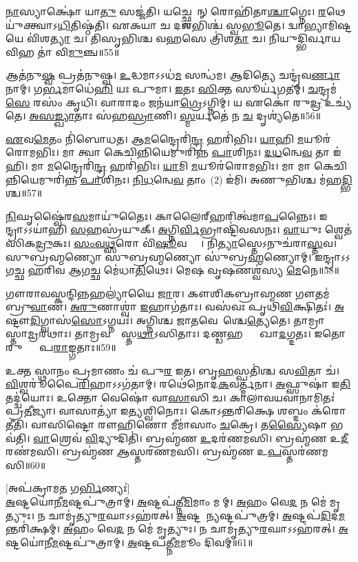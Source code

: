 \ul{𑌨𑌾}𑌸𑍍𑌯𑌾𑌕𑍍𑌷𑍋॑ 𑌯𑌾\ul{𑌤𑍁} 𑌸𑌜𑍍𑌜॑𑌤𑌿। 𑌯𑌚𑍍𑌛𑍍𑌵𑍇𑌤𑌾᳚𑌨𑍍‌ 𑌰𑍋𑌹𑌿॑𑌤𑌾\ul{𑌶𑍍𑌚𑌾}𑌗𑍍𑌨𑍇𑌃। 
\ul{𑌰}𑌥𑍇 𑌯𑍁॑𑌕𑍍𑌤𑍍𑌵𑌾𑌽\ul{𑌧𑌿}\-𑌤𑌿𑌷𑍍𑌠॑𑌤𑌿। 𑌏𑌕𑌯𑌾 𑌚 𑌦𑌶𑌭𑌿𑌶𑍍𑌚॑ 𑌸𑍍𑌵\ul{𑌭𑍂}𑌤𑍇। 
𑌦𑍍𑌵𑌾𑌭𑍍𑌯𑌾𑌮𑌿𑌷𑍍𑌟𑌯𑍇 𑌵𑌿॑𑌶\ul{𑌤𑍍𑌯𑌾} 𑌚। 𑌤𑌿𑌸𑍃𑌭𑌿𑌶𑍍𑌚 𑌵𑌹𑌸𑍇 𑌤𑍍𑌰𑌿॑𑌶\ul{𑌤𑌾} 𑌚। 
𑌨𑌿𑌯𑍁𑌦𑍍𑌭𑌿𑌰𑍍𑌵𑌾𑌯𑌵𑌿𑌹 𑌤𑌾॑ 𑌵𑌿\ul{𑌮𑍁}𑌞𑍍𑌚॥55॥\anuvakamend


𑌆𑌤॑𑌨𑍁\ul{𑌷𑍍𑌵} 𑌪𑍍𑌰𑌤॑𑌨𑍁𑌷𑍍𑌵। \ul{𑌉}𑌦𑍍𑌧𑌮𑌾𑌽𑌽𑌧॑\ul{𑌮} 𑌸𑌨𑍍𑌧॑𑌮। 
𑌆𑌦𑌿𑌤𑍍𑌯𑍇 𑌚𑌨𑍍𑌦𑍍𑌰॑𑌵\ul{𑌰𑍍𑌣𑌾}𑌨𑌾𑌮𑍍‌। 𑌗\ul{𑌰𑍍𑌭}𑌮𑌾𑌧𑍇॑\ul{𑌹𑌿} 𑌯𑌃 𑌪𑍁𑌮𑌾\sn{}। 
\ul{𑌇}𑌤𑌃 \ul{𑌸𑌿}𑌕𑍍𑌤 𑌸𑍂𑌰𑍍𑌯॑𑌗𑌤𑌮𑍍‌। \ul{𑌚}𑌨𑍍𑌦𑍍𑌰𑌮॑\ul{𑌸𑍇} 𑌰𑌸𑌂॑ 𑌕𑍃𑌧𑌿। 
𑌵𑌾𑌰𑌾𑌦𑌂 𑌜𑌨॑𑌯𑌾\ul{𑌗𑍍𑌰𑍇}𑌽𑌗𑍍𑌨𑌿𑌮𑍍‌। 𑌯 𑌏𑌕𑍋॑ 𑌰𑍁\ul{𑌦𑍍𑌰} 𑌉𑌚𑍍𑌯॑𑌤𑍇। 
\ul{𑌅}\ul{𑌸}\ul{𑌙𑍍𑌖𑍍𑌯𑌾}𑌤𑌾𑌃 𑌸॑𑌹\ul{𑌸𑍍𑌰𑌾}𑌣𑌿। \ul{𑌸𑍍𑌮}𑌰𑍍𑌯𑌤𑍇॑ 𑌨 \ul{𑌚} 𑌦𑍃𑌶𑍍𑌯॑𑌤𑍇॥56॥


\ul{𑌏}𑌵\ul{𑌮𑍇}𑌤𑌂 𑌨𑌿॑𑌬𑍋𑌧𑌤। 𑌆\ul{𑌮}𑌨𑍍𑌦𑍍𑌰𑍈𑌰𑌿॑\ul{𑌨𑍍𑌦𑍍𑌰} 𑌹𑌰𑌿॑𑌭𑌿𑌃। 
\ul{𑌯𑌾}𑌹𑌿 \ul{𑌮}𑌯𑍂𑌰॑𑌰𑍋𑌮𑌭𑌿𑌃। 𑌮𑌾 𑌤𑍍𑌵𑌾 𑌕𑍇𑌚𑌿𑌨𑍍𑌨𑌿𑌯𑍇𑌮𑍁𑌰𑌿॑𑌨𑍍𑌨 \ul{𑌪𑌾}𑌶𑌿𑌨𑌃। 
\ul{𑌦}\ul{𑌧}𑌨𑍍𑌵𑍇\ul{𑌵} 𑌤𑌾 𑌇॑𑌹𑌿। 𑌮𑌾 \ul{𑌮}𑌨𑍍𑌦𑍍𑌰𑍈𑌰𑌿॑\ul{𑌨𑍍𑌦𑍍𑌰} 𑌹𑌰𑌿॑𑌭𑌿𑌃। 
\ul{𑌯𑌾}𑌮𑌿 \ul{𑌮}𑌯𑍂𑌰॑𑌰𑍋𑌮𑌭𑌿𑌃। 𑌮𑌾 𑌮𑌾 𑌕𑍇𑌚𑌿𑌨𑍍𑌨𑌿𑌯𑍇𑌮𑍁𑌰𑌿॑𑌨𑍍𑌨 \ul{𑌪𑌾}𑌶𑌿𑌨𑌃। 
\ul{𑌨𑌿}\ul{𑌧}𑌨𑍍𑌵𑍇\ul{𑌵} \mbox{𑌤𑌾𑌂 (2)} 𑌇॑𑌮𑌿। 𑌅𑌣𑍁𑌭𑌿𑌶𑍍𑌚 𑌮॑𑌹\ul{𑌦𑍍𑌭𑌿}𑌶𑍍𑌚॥57॥


\ul{𑌨𑌿}𑌘𑍃𑌷𑍍𑌵𑍈॑𑌰\ul{𑌸}𑌮𑌾𑌯𑍁॑𑌤𑍈𑌃। 𑌕𑌾𑌲𑍈𑌰𑍍‌𑌹𑌰𑌿𑌤𑍍𑌵॑𑌮𑌾\ul{𑌪}𑌨𑍍𑌨𑍈𑌃। 
𑌇𑌨𑍍𑌦𑍍𑌰𑌾𑌽𑌽𑌯𑌾॑𑌹𑌿 \ul{𑌸}𑌹𑌸𑍍𑌰॑𑌯𑍁𑌕𑍍‌। \ul{𑌅}𑌗𑍍𑌨𑌿\ul{𑌰𑍍𑌵𑌿}𑌭𑍍𑌰𑌾𑌷𑍍𑌟𑌿॑𑌵𑌸𑌨𑌃। 
\ul{𑌵𑌾}𑌯𑍁𑌃 𑌶𑍍𑌵𑍇𑌤॑𑌸𑌿𑌕\ul{𑌦𑍍𑌰𑍁}𑌕𑌃। \ul{𑌸𑌂}\ul{𑌵}\ul{𑌥𑍍𑌸}𑌰𑍋 𑌵𑌿॑\ul{𑌷𑍂}𑌵𑌰𑍍𑌣𑍈𑌃᳚। 
𑌨𑌿\ul{𑌤𑍍𑌯𑌾}𑌸𑍍𑌤𑍇𑌽𑌨𑍁𑌚॑𑌰𑌾\ul{𑌸𑍍𑌤}𑌵। 𑌸𑍁𑌬𑍍𑌰𑌹𑍍𑌮𑌣𑍍𑌯𑍋 𑌸𑍁𑌬𑍍𑌰𑌹𑍍𑌮𑌣𑍍𑌯𑍋 𑌸𑍁॑𑌬𑍍𑌰\ul{𑌹𑍍𑌮}𑌣𑍍𑌯𑍋𑌮𑍍‌। 
𑌇𑌨𑍍𑌦𑍍𑌰𑌾𑌽𑌽𑌗𑌚𑍍𑌛 𑌹𑌰𑌿𑌵 𑌆𑌗𑌚𑍍𑌛 𑌮𑍇॑𑌧𑌾\ul{𑌤𑌿}𑌥𑍇𑌃। 𑌮𑍇𑌷 𑌵𑍃𑌷𑌣𑌶𑍍𑌵॑𑌸𑍍𑌯 \ul{𑌮𑍇}𑌨𑍇॥58॥


𑌗𑍗𑌰𑌾𑌵𑌸𑍍𑌕𑌨𑍍𑌦𑌿𑌨𑍍𑌨𑌹𑌲𑍍𑌯𑌾॑𑌯𑍈 \ul{𑌜𑌾}𑌰। 𑌕𑍗𑌶𑌿𑌕𑌬𑍍𑌰𑌾𑌹𑍍𑌮𑌣 𑌗𑍗𑌤𑌮॑𑌬𑍍𑌰𑍁\ul{𑌵𑌾}𑌣। 
\ul{𑌅}\ul{𑌰𑍁}𑌣𑌾𑌶𑍍𑌵𑌾॑ \ul{𑌇}𑌹𑌾𑌗॑𑌤𑌾𑌃। 𑌵𑌸॑𑌵𑌃 𑌪𑍃𑌥𑌿\ul{𑌵𑌿}𑌕𑍍𑌷𑌿𑌤𑌃॑। 
\ul{𑌅}𑌷𑍍𑌟𑍗\ul{𑌦𑌿}𑌗𑍍𑌵𑌾𑌸॑\ul{𑌸𑍋}\-𑌽𑌗𑍍𑌨𑌯𑌃॑। 𑌅𑌗𑍍𑌨𑌿𑌶𑍍𑌚 𑌜𑌾𑌤𑌵𑍇𑌦𑌾᳚𑌶𑍍𑌚𑍇\ul{𑌤𑍍𑌯𑍇}𑌤𑍇। 
𑌤𑌾𑌮𑍍𑌰𑌾𑌶𑍍𑌵𑌾᳚𑌸𑍍𑌤𑌾\ul{𑌮𑍍𑌰}𑌰𑌥𑌾𑌃। 𑌤𑌾𑌮𑍍𑌰𑌵𑌰𑍍𑌣𑌾᳚𑌸𑍍𑌤\ul{𑌥𑌾}\-𑌽𑌸𑌿𑌤𑌾𑌃। 
𑌦𑌣𑍍𑌡𑌹𑌸𑍍𑌤𑌾𑌃᳚ 𑌖𑌾\ul{𑌦}𑌗𑍍𑌦𑌤𑌃। 𑌇𑌤𑍋 𑌰𑍁𑌦𑍍𑌰𑌾𑌃᳚ 𑌪\ul{𑌰𑌾}𑌙𑍍𑌗𑌤𑌾𑌃॥59॥


𑌉𑌕𑍍𑌤 𑌸𑍍𑌥𑌾𑌨𑌂 𑌪𑍍𑌰𑌮𑌾𑌣𑌂 𑌚॑ 𑌪𑍁\ul{𑌰} 𑌇𑌤। 𑌬𑍃\ul{𑌹}𑌸𑍍𑌪𑌤𑌿॑𑌶𑍍𑌚 𑌸\ul{𑌵𑌿}𑌤𑌾 𑌚॑। 
\ul{𑌵𑌿}𑌶𑍍𑌵𑌰𑍂॑𑌪𑍈\ul{𑌰𑌿}𑌹𑌾𑌽𑌽𑌗॑𑌤𑌾𑌮𑍍‌। 𑌰𑌥𑍇॑𑌨𑍋𑌦\ul{𑌕}𑌵𑌰𑍍𑌤𑍍𑌮॑𑌨𑌾। 
\ul{𑌅}𑌫𑍍𑌸𑍁𑌷𑌾॑ 𑌇\ul{𑌤𑌿} 𑌤𑌦𑍍𑌦𑍍𑌵॑𑌯𑍋𑌃। 𑌉𑌕𑍍𑌤𑍋 𑌵𑍇𑌷𑍋॑ 𑌵𑌾\ul{𑌸𑌾}\ul{}𑌸𑌿 𑌚। 
𑌕𑌾𑌲𑌾𑌵𑌯𑌵𑌾𑌨𑌾𑌮𑌿𑌤𑌃॑ 𑌪𑍍𑌰\ul{𑌤𑍀}𑌜𑍍𑌯𑌾। 𑌵𑌾𑌸𑌾𑌤𑍍𑌯𑌾॑ 𑌇\ul{𑌤𑍍𑌯}𑌶𑍍𑌵𑌿𑌨𑍋𑌃। 
𑌕𑍋𑌽𑌨𑍍𑌤𑌰𑌿𑌕𑍍𑌷𑍇 𑌶𑌬𑍍𑌦𑌂 𑌕॑𑌰𑍋\ul{𑌤𑍀}𑌤𑌿। 𑌵𑌾𑌸𑌿𑌷𑍍𑌟𑍋 𑌰𑍗𑌹𑌿𑌣𑍋 𑌮𑍀𑌮𑌾॑𑌸𑌾𑌂 \ul{𑌚}𑌕𑍍𑌰𑍇। 
𑌤\ul{𑌸𑍍𑌯𑍈}𑌷𑌾 𑌭𑌵॑𑌤𑌿। \ul{𑌵𑌾}𑌶𑍍𑌰𑍇𑌵॑ \ul{𑌵𑌿}𑌦𑍍𑌯𑍁𑌦𑌿𑌤𑌿॑। 
𑌬𑍍𑌰𑌹𑍍𑌮॑𑌣 \ul{𑌉}𑌦𑌰॑𑌣𑌮𑌸𑌿। 𑌬𑍍𑌰𑌹𑍍𑌮॑𑌣 𑌉\ul{𑌦𑍀}𑌰𑌣॑𑌮𑌸𑌿। 
𑌬𑍍𑌰𑌹𑍍𑌮॑𑌣 \ul{𑌆}𑌸𑍍𑌤𑌰॑𑌣𑌮𑌸𑌿। 𑌬𑍍𑌰𑌹𑍍𑌮॑𑌣 𑌉\ul{𑌪}𑌸𑍍𑌤𑌰॑𑌣𑌮𑌸𑌿॥60॥\anuvakamend


[𑌅𑌪॑𑌕𑍍𑌰𑌾𑌮𑌤 𑌗\ul{𑌰𑍍𑌭𑌿}𑌣𑍍𑌯𑌃॑]\\
\ul{𑌅}𑌷𑍍𑌟𑌯𑍋॑𑌨𑍀\ul{𑌮}𑌷𑍍𑌟𑌪𑍁॑𑌤𑍍𑌰𑌾𑌮𑍍‌। \ul{𑌅}𑌷𑍍𑌟𑌪॑𑌤𑍍𑌨𑍀\ul{𑌮𑌿}𑌮𑌾𑌂 𑌮𑌹𑍀᳚𑌮𑍍‌। 
\ul{𑌅}𑌹𑌂 𑌵𑍇\ul{𑌦} 𑌨 𑌮𑍇॑ 𑌮𑍃𑌤𑍍𑌯𑍁𑌃। 𑌨 𑌚𑌾𑌮𑍃॑𑌤𑍍𑌯𑍁\ul{𑌰}𑌘𑌾𑌽𑌽𑌹॑𑌰𑌤𑍍‌। 
\ul{𑌅}𑌷𑍍𑌟𑌯𑍋᳚\ul{𑌨𑍍𑌯}𑌷𑍍𑌟𑌪𑍁॑𑌤𑍍𑌰𑌮𑍍‌। \ul{𑌅}𑌷𑍍𑌟𑌪॑\ul{𑌦𑌿}𑌦\ul{𑌮}𑌨𑍍𑌤𑌰𑌿॑𑌕𑍍𑌷𑌮𑍍‌। 
\ul{𑌅}𑌹𑌂 𑌵𑍇\ul{𑌦} 𑌨 𑌮𑍇॑ 𑌮𑍃𑌤𑍍𑌯𑍁𑌃। 𑌨 𑌚𑌾𑌮𑍃॑𑌤𑍍𑌯𑍁\ul{𑌰}𑌘𑌾𑌽𑌽𑌹॑𑌰𑌤𑍍‌। 
\ul{𑌅}𑌷𑍍𑌟𑌯𑍋॑𑌨𑍀\ul{𑌮}𑌷𑍍𑌟𑌪𑍁॑𑌤𑍍𑌰𑌾𑌮𑍍‌। \ul{𑌅}𑌷𑍍𑌟𑌪॑𑌤𑍍𑌨𑍀\ul{𑌮}𑌮𑍂𑌂 𑌦𑌿𑌵𑌮𑍍‌᳚॥61॥


